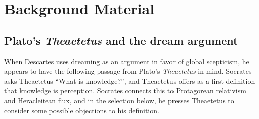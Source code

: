 \chapter*{Background Material}

\section*{Plato's \textit{Theaetetus} and the dream argument}

When Descartes uses dreaming as an argument in favor of global scepticism, he appears to have the following passage from Plato's \textit{Theaetetus} in mind. Socrates asks Theaetetus ``What is knowledge?'', and Theaetetus offers as a first definition that knowledge is perception. Socrates connects this to Protagorean relativism and Heracleitean flux, and in the selection below, he presses Theaetetus to consider some possible objections to his definition.

